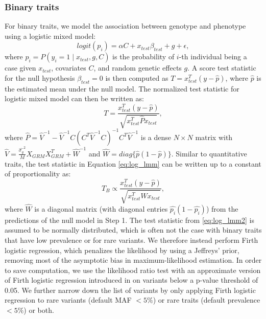 \subsubsection{Binary traits}
%
For binary traits, we model the association between genotype and phenotype using a logistic mixed model:
\begin{equation}
    logit(p_i) = \alpha C + x_{test}\beta_{test} + g + \epsilon, \label{eq:log_lmm}
\end{equation}
where $p_i = P(y_i = 1 \mid x_{test}, g, C)$ is the probability of $i$-th individual being a case given $x_{test}$, covariates $C$, and random genetic effects $g$.
%
A score test statistic for the null hypothesis $\beta_{test} = 0$ is then computed as $T = x_{test}^T(y - \hat{p})$, where $\hat{p}$ is the estimated mean under the null model.
%
The normalized test statistic for logistic mixed model can then be written as: 
\begin{equation}
    T = \frac{x_{test}^T(y - \hat{p})}{\sqrt{x_{test}^T\hat{P}x_{test}}},
\label{eq:log_lmm1}
\end{equation}
where $\hat{P} = \hat{V}^{-1} - \hat{V}^{-1} C(C^T\hat{V}^{-1}C)^{-1}C^T\hat{V}^{-1}$ is a dense $N \times N$ matrix with $\hat{V} = \frac{\hat{\sigma_g}^2}{M} X_{GRM}X_{GRM}^T + \hat{W}^{-1}$ and $\hat{W} = diag\{ \hat{p} (1-\hat{p}) \}$.
%
Similar to quantitative traits, the test statistic in Equation \ref{eq:log_lmm} can be written up to a constant of proportionality \cite{zhou2018efficiently} as:
\begin{equation}
    T_{B} \propto \frac{x_{test}^T(y - \hat{p})}{\sqrt{x_{test}^T\hat{W}x_{test}}},
\label{eq:log_lmm2}
\end{equation}
where $\hat{W}$ is a diagonal matrix (with diagonal entries $\hat{p_i} (1-\hat{p_i})$) from the predictions of the null model in Step 1.
%
The test statistic from \ref{eq:log_lmm2} is assumed to be normally distributed, which is often not the case with binary traits that have low prevalence or for rare variants.
%
We therefore instead perform Firth logistic regression, which penalizes the likelihood by using a Jeffreys' prior, removing most of the asymptotic bias in maximum-likelihood estimation.
%
In order to save computation, we use the likelihood ratio test with an approximate version of Firth logistic regression introduced in \cite{mbatchou2021computationally} on variants below a p-value threshold of 0.05. 
%
We further narrow down the list of variants by only applying Firth logistic regression to rare variants (default MAF $< 5\%$) or rare traits (default prevalence $< 5\%$) or both.

